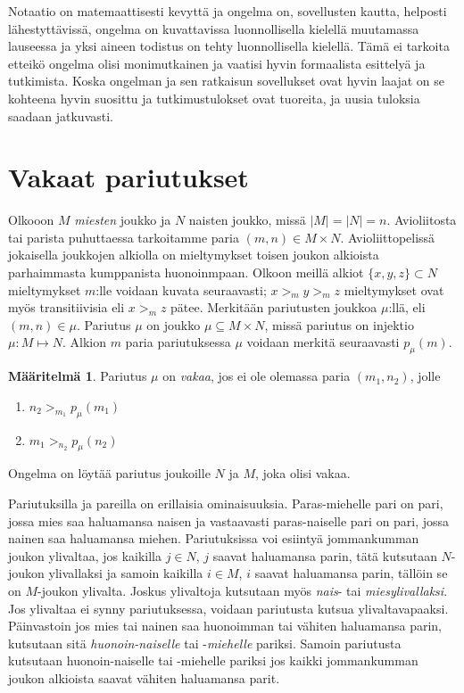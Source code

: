 \documentclass[finnish]{tktltiki2}
\theoremstyle{definition}
\newtheorem{maar}[lau]{Määritelmä}
\theoremstyle{remark}
\begin{document}
Notaatio on matemaattisesti kevyttä ja ongelma on, sovellusten kautta, helposti lähestyttävissä, ongelma on kuvattavissa luonnollisella kielellä muutamassa lauseessa ja yksi aineen todistus on tehty luonnollisella kielellä. Tämä ei tarkoita etteikö ongelma olisi monimutkainen ja vaatisi hyvin formaalista esittelyä ja tutkimista. Koska ongelman ja sen ratkaisun sovellukset ovat hyvin laajat on se kohteena hyvin suosittu ja tutkimustulokset ovat tuoreita, ja uusia tuloksia saadaan jatkuvasti.


\section{Vakaat pariutukset}
Olkooon $M$ \emph{miesten} joukko ja $N$ naisten joukko, missä $|M| = |N| = n$. Avioliitosta tai parista puhuttaessa tarkoitamme paria $(m, n) \in M \times N$. Avioliittopelissä jokaisella joukkojen alkiolla on mieltymykset toisen joukon alkioista parhaimmasta kumppanista huonoinmpaan. Olkoon meillä alkiot $\{x, y, z\} \subset N$ mieltymykset $m$:lle voidaan kuvata seuraavasti; $x >_m y >_m z$ mieltymykset ovat myös transitiivisia eli $x >_m z$ pätee. Merkitään pariutusten joukkoa $\mu$:llä, eli $(m,n) \in \mu$. Pariutus $\mu$ on joukko $\mu \subseteq M \times N$, missä pariutus on injektio $\mu : M \mapsto N$. Alkion $m$ paria pariutuksessa $\mu$ voidaan merkitä seuraavasti $p_{\mu}(m)$.

\begin{maar}
Pariutus $\mu$ on \emph{vakaa}, jos ei ole olemassa paria $(m_1, n_2)$, jolle
\begin{enumerate}
	\item $n_2 >_{m_{1}} p_{\mu}(m_1)$
	\item $m_1 >_{n_{2}} p_{\mu}(n_2)$
\end{enumerate}
Ongelma on löytää pariutus joukoille $N$ ja $M$, joka olisi vakaa.
\end{maar}
Pariutuksilla ja pareilla on erillaisia ominaisuuksia. Paras-miehelle pari on pari, jossa mies saa haluamansa naisen ja vastaavasti paras-naiselle pari on pari, jossa nainen saa haluamansa miehen. Pariutuksissa voi esiintyä jommankumman joukon ylivaltaa, jos kaikilla $j \in N$, $j$ saavat haluamansa parin, tätä kutsutaan $N$-joukon ylivallaksi ja samoin kaikilla $i \in M$, $i$ saavat haluamansa parin, tällöin se on $M$-joukon ylivalta. Joskus ylivaltoja kutsutaan myös \emph{nais}- tai \emph{miesylivallaksi}. Jos ylivaltaa ei synny pariutuksessa, voidaan pariutusta kutsua ylivaltavapaaksi.
Päinvastoin jos mies tai nainen saa huonoimman tai vähiten haluamansa parin, kutsutaan sitä \emph{huonoin-naiselle} tai -\emph{miehelle} pariksi. Samoin pariutusta kutsutaan huonoin-naiselle tai -miehelle pariksi jos kaikki jommankumman joukon alkioista saavat vähiten haluamansa parit.
\end{document}
